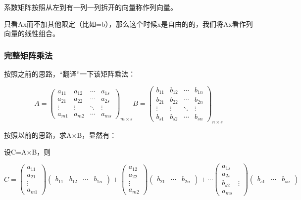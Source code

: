 \documentclass[12.8pt,a4paper,numbering = AMSalpha]{book}
\begin{document}
系数矩阵按照从左到有一列一列拆开的向量称作列向量。

只看Ax而不加其他限定（比如=b），那么这个时候x是自由的的，我们将Ax看作列向量的线性组合。

\subsubsection{完整矩阵乘法}

按照之前的思路，“翻译”一下该矩阵乘法：

\[
A=\begin{pmatrix}
	a_{11} & a_{12} & \cdots & a_{1s}\\
	a_{21} & a_{22} & \cdots & a_{2s}\\
	\vdots & \vdots & \ddots & \vdots\\
	a_{m1} & a_{m2} & \cdots & a_{ms}
\end{pmatrix}_{m\times s}
B=\begin{pmatrix}
	b_{11} & b_{12} & \cdots & b_{1n}\\
	b_{21} & b_{22} & \cdots & b_{2n}\\
	\vdots & \vdots & \ddots & \vdots\\
	b_{s1} & b_{s2} & \cdots & b_{sn}
\end{pmatrix}_{n\times s}
\]

按照以前的思路，求A$\times$B，显然有：

设C=A$\times$B，则

\[
C=
\begin{pmatrix}
	a_{11}\\
	a_{21}\\
	\vdots\\
	a_{m1}
\end{pmatrix}
\begin{pmatrix}
	b_{11} & b_{12} & \cdots & b_{1n}
\end{pmatrix}
+
\begin{pmatrix}
	a_{12}\\
	a_{22}\\
	\vdots\\
	a_{m2}
\end{pmatrix}
\begin{pmatrix}
	b_{21} &
	\cdots &
	b_{2n}
\end{pmatrix}
+\cdots
\begin{pmatrix}
	a_{1s}\\
	a_{2s}\\
	b_{s2} &
	\vdots\\
	a_{ms}
\end{pmatrix}
\begin{pmatrix}
	b_{s1} &
	\cdots &
	b_{sn}
\end{pmatrix}
\]
\end{document}
